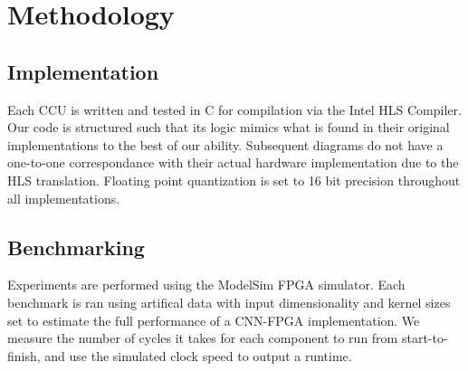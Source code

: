 \chapter{Methodology}
\section{Implementation}
Each CCU is written and tested in C for compilation via the Intel HLS Compiler. Our code is structured such that its logic mimics what is found in their original implementations to the best of our ability. Subsequent diagrams do not have a one-to-one correspondance with their actual hardware implementation due to the HLS translation. Floating point quantization is set to 16 bit precision throughout all implementations.

\section{Benchmarking}
Experiments are performed using the ModelSim FPGA simulator. Each benchmark is ran using artifical data with input dimensionality and kernel sizes set to estimate the full performance of a CNN-FPGA implementation. We measure the number of cycles it takes for each component to run from start-to-finish, and use the simulated clock speed to output a runtime.